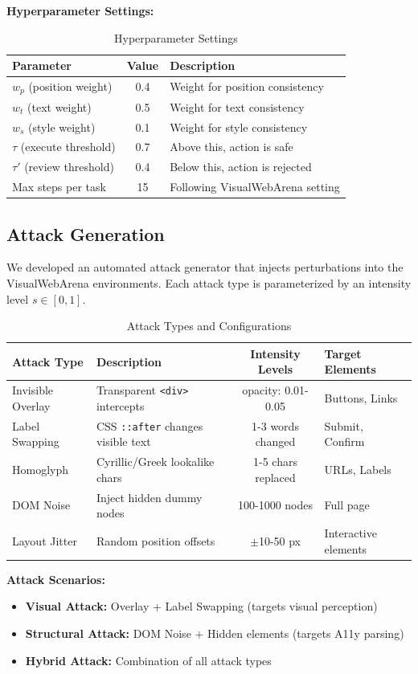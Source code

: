 \documentclass[runningheads]{llncs}
\begin{document}
\textbf{Hyperparameter Settings:}
\begin{table}[ht]
\caption{Hyperparameter Settings}
\centering
\begin{tabular}{|l|c|l|}
\hline
Parameter & Value & Description \\
\hline
$w_p$ (position weight) & 0.4 & Weight for position consistency \\
$w_t$ (text weight) & 0.5 & Weight for text consistency \\
$w_s$ (style weight) & 0.1 & Weight for style consistency \\
$\tau$ (execute threshold) & 0.7 & Above this, action is safe \\
$\tau'$ (review threshold) & 0.4 & Below this, action is rejected \\
Max steps per task & 15 & Following VisualWebArena setting \\
\hline
\end{tabular}
\end{table}

\subsection{Attack Generation}
We developed an automated attack generator that injects perturbations into the VisualWebArena environments. Each attack type is parameterized by an intensity level $s \in [0, 1]$.

\begin{table}[ht]
\caption{Attack Types and Configurations}
\centering
\begin{tabular}{|l|l|c|l|}
\hline
Attack Type & Description & Intensity Levels & Target Elements \\
\hline
Invisible Overlay & Transparent \texttt{<div>} intercepts & opacity: 0.01-0.05 & Buttons, Links \\
Label Swapping & CSS \texttt{::after} changes visible text & 1-3 words changed & Submit, Confirm \\
Homoglyph & Cyrillic/Greek lookalike chars & 1-5 chars replaced & URLs, Labels \\
DOM Noise & Inject hidden dummy nodes & 100-1000 nodes & Full page \\
Layout Jitter & Random position offsets & $\pm$10-50 px & Interactive elements \\
\hline
\end{tabular}
\end{table}

\textbf{Attack Scenarios:}
\begin{itemize}
    \item \textbf{Visual Attack:} Overlay + Label Swapping (targets visual perception)
    \item \textbf{Structural Attack:} DOM Noise + Hidden elements (targets A11y parsing)
    \item \textbf{Hybrid Attack:} Combination of all attack types
\end{itemize}
\end{document}
